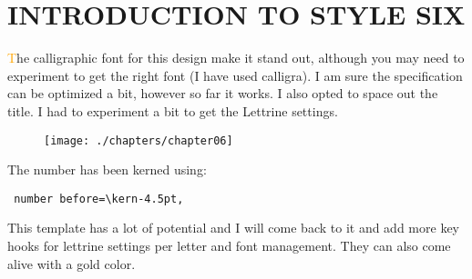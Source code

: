 


\chapter{INTRODUCTION TO STYLE SIX}
\renewcommand{\DefaultLhang}{0.1}
\renewcommand{\LettrineFontHook}{\calligra}
\setlength{\DefaultFindent}{9.5pt}
\setlength{\DefaultNindent}{0pt}

\lettrine{\textcolor{orange}{T}}{}he calligraphic font for this design make it stand out, although you may need to experiment to get the right font (I have used calligra). I am sure the specification can be optimized a bit, however so far it works. I also opted to space out the title. I had to experiment a bit to get the Lettrine settings.
\medskip
\begin{figure}[ht]
\centering
\texttt{[image: ./chapters/chapter06]}
\end{figure}

The number has been kerned using:

\begin{lstlisting}
 number before=\kern-4.5pt,
\end{lstlisting}

This template has a lot of potential and I will come back to it and add more key hooks for lettrine settings per letter and font management. They can also come alive with a gold color.

